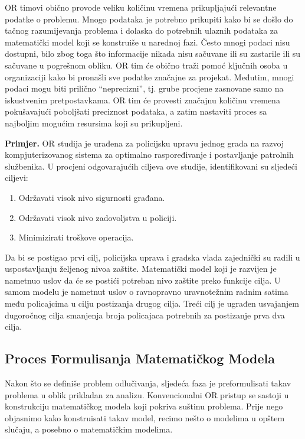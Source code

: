 \documentclass[a4paper, utf8, 11pt, colorlinks]{article}
\begin{document}
 OR timovi obično provode veliku količinu vremena prikupljajući relevantne podatke o problemu. Mnogo podataka je potrebno prikupiti kako bi se došlo do tačnog razumijevanja problema i dolaska do potrebnih ulaznih podataka za matematički model koji se konstruiše u narednoj fazi.  Često mnogi    podaci nisu dostupni, bilo zbog toga što informacije nikada nisu sačuvane ili su zastarile ili su sačuvane u pogrešnom obliku.   OR tim će obično   traži pomoć ključnih osoba u organizaciji kako bi pronašli sve podatke značajne za projekat. Međutim, mnogi podaci mogu biti prilično ``neprecizni'', tj. grube procjene zasnovane samo na iskustvenim pretpostavkama. OR tim će provesti značajnu količinu vremena pokušavajući poboljšati
preciznost podataka, a zatim nastaviti proces sa najboljim mogućim resursima koji su prikupljeni. 

\textbf{Primjer.}  OR studija je urađena za policijsku upravu jednog grada %
na razvoj kompjuterizovanog sistema za optimalno raspoređivanje i postavljanje patrolnih službenika. U procjeni odgovarajućih ciljeva ove studije, identifikovani su sljedeći ciljevi:
\begin{enumerate}
    \item  Održavati visok nivo sigurnosti građana.
    \item  Održavati visok nivo zadovoljstva u policiji.
     \item Minimizirati troškove operacija.
\end{enumerate}
Da bi se postigao prvi cilj, policijska uprava i gradska vlada zajednički su radili u uspostavljanju željenog nivoa zaštite.  Matematički model koji je razvijen je nametnuo uslov da će se postići potreban nivo zaštite preko funkcije cilja. U samom modelu je nametnut uslov o ravnopravno uravnotežnim radnim satima među policajcima u cilju postizanja drugog cilja. Treći cilj je ugrađen usvajanjem dugoročnog cilja smanjenja broja policajaca potrebnih za postizanje prva dva cilja. 

\subsection{Proces Formulisanja Matematičkog Modela}

Nakon što se definiše problem odlučivanja, sljedeća faza je preformulisati takav problema u oblik prikladan za analizu. Konvencionalni OR pristup se sastoji u konstrukciju matematičkog modela koji pokriva suštinu problema. Prije nego objasnimo kako konstruisati takav model, recimo nešto o modelima u opštem slučaju, a posebno o matematičkim modelima.
\end{document}
